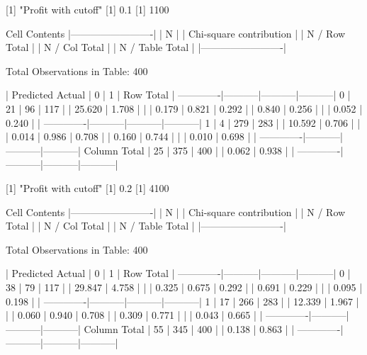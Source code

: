 \documentclass{article}
\begin{document}
\begin{Schunk}
\begin{Soutput}
 
[1] "Profit with cutoff"
[1] 0.1
[1] 1100

 
   Cell Contents
|-------------------------|
|                       N |
| Chi-square contribution |
|           N / Row Total |
|           N / Col Total |
|         N / Table Total |
|-------------------------|

 
Total Observations in Table:  400 

 
             | Predicted 
      Actual |         0 |         1 | Row Total | 
-------------|-----------|-----------|-----------|
           0 |        21 |        96 |       117 | 
             |    25.620 |     1.708 |           | 
             |     0.179 |     0.821 |     0.292 | 
             |     0.840 |     0.256 |           | 
             |     0.052 |     0.240 |           | 
-------------|-----------|-----------|-----------|
           1 |         4 |       279 |       283 | 
             |    10.592 |     0.706 |           | 
             |     0.014 |     0.986 |     0.708 | 
             |     0.160 |     0.744 |           | 
             |     0.010 |     0.698 |           | 
-------------|-----------|-----------|-----------|
Column Total |        25 |       375 |       400 | 
             |     0.062 |     0.938 |           | 
-------------|-----------|-----------|-----------|

 
[1] "Profit with cutoff"
[1] 0.2
[1] 4100

 
   Cell Contents
|-------------------------|
|                       N |
| Chi-square contribution |
|           N / Row Total |
|           N / Col Total |
|         N / Table Total |
|-------------------------|

 
Total Observations in Table:  400 

 
             | Predicted 
      Actual |         0 |         1 | Row Total | 
-------------|-----------|-----------|-----------|
           0 |        38 |        79 |       117 | 
             |    29.847 |     4.758 |           | 
             |     0.325 |     0.675 |     0.292 | 
             |     0.691 |     0.229 |           | 
             |     0.095 |     0.198 |           | 
-------------|-----------|-----------|-----------|
           1 |        17 |       266 |       283 | 
             |    12.339 |     1.967 |           | 
             |     0.060 |     0.940 |     0.708 | 
             |     0.309 |     0.771 |           | 
             |     0.043 |     0.665 |           | 
-------------|-----------|-----------|-----------|
Column Total |        55 |       345 |       400 | 
             |     0.138 |     0.863 |           | 
-------------|-----------|-----------|-----------|


\end{Soutput}
\end{Schunk}
\end{document}
